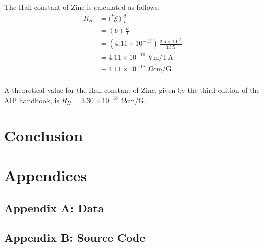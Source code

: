 \documentclass[a4paper]{article}
\begin{document}
The Hall constant of Zinc is calculated as follows.
\begin{align*}
R_H &= \big( \frac{\mu_H}{B} \big) \, \frac{d}{I} \\
    &= (b) \, \frac{d}{I} \\
    &= (4.11 \times 10^{-13}) \, \frac{2.5 \times 10^{-5}}{13.5} \\
    &= 4.11 \times 10^{-11} \; \text{Vm/TA} \\
    &\equiv 4.11 \times 10^{-13} \; \Omega \text{cm/G} \\
\end{align*}

A theoretical value for the Hall constant of Zinc, given by the third edition of the AIP handbook, is $R_H = 3.30 \times 10^{-13} \; \Omega \text{cm/G}$.




\section{Conclusion}

\section{Appendices}

\subsection{Appendix A: Data}

\subsection{Appendix B: Source Code}
\end{document}
